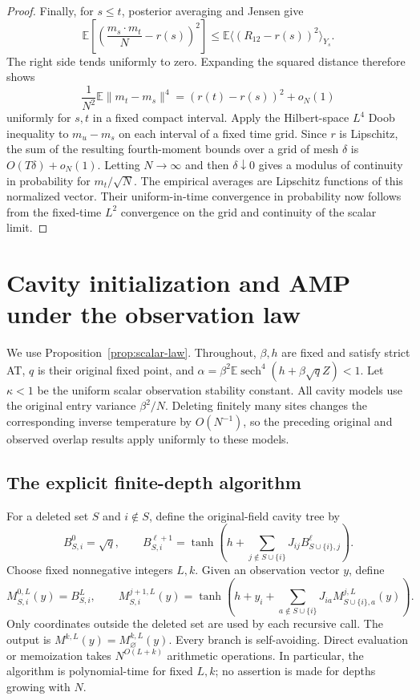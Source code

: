 \documentclass[11pt,reqno]{amsart}
\begin{document}
\begin{proof}
Finally, for $s\le t$, posterior averaging and Jensen give
\[
 \mathbb E\left[\left(\frac{m_s\cdot m_t}{N}-r(s)\right)^2\right]
 \le\mathbb E\langle(R_{12}-r(s))^2\rangle_{Y_s}.
\]
The right side tends uniformly to zero. Expanding the squared distance
therefore shows
\[
 \frac1{N^2}\mathbb E\|m_t-m_s\|^4
 =(r(t)-r(s))^2+o_N(1)
\]
uniformly for $s,t$ in a fixed compact interval.
Apply the Hilbert-space $L^4$ Doob inequality to $m_u-m_s$ on each interval
of a fixed time grid. Since $r$ is Lipschitz, the sum of the resulting
fourth-moment bounds over a grid of mesh $\delta$ is $O(T\delta)+o_N(1)$.
Letting $N\to\infty$ and then $\delta\downarrow0$ gives a modulus of
continuity in probability for $m_t/\sqrt N$.
The empirical averages are Lipschitz functions of this normalized vector.
Their uniform-in-time convergence in probability now follows from the
fixed-time $L^2$ convergence on the grid and continuity of the scalar limit.
\end{proof}


\section{Cavity initialization and AMP under the observation law}\label{sec:initializer-proof}

We use Proposition~\ref{prop:scalar-law}.  Throughout, $\beta,h$ are fixed and satisfy
strict AT, $q$ is their original fixed point, and
$\alpha=\beta^2\mathbb E\operatorname{sech}^4(h+\beta\sqrt q Z)<1$.
Let $\kappa<1$ be the uniform scalar observation stability constant.
All cavity models use the original entry variance $\beta^2/N$.
Deleting finitely many sites changes the corresponding inverse temperature
by $O(N^{-1})$, so the preceding original and observed overlap results
apply uniformly to these models.

\subsection{The explicit finite-depth algorithm}

For a deleted set $S$ and $i\notin S$, define the original-field cavity
tree by
\[
 B^0_{S,i}=\sqrt q,\qquad
 B^{\ell+1}_{S,i}=
 \tanh\left(h+\sum_{j\notin S\cup\{i\}}J_{ij}B^\ell_{S\cup\{i\},j}\right).
\]
Choose fixed nonnegative integers $L,k$.  Given an observation vector $y$,
define
\[
 M^{0,L}_{S,i}(y)=B^L_{S,i},\qquad
 M^{j+1,L}_{S,i}(y)=
 \tanh\left(h+y_i+\sum_{a\notin S\cup\{i\}}
                 J_{ia}M^{j,L}_{S\cup\{i\},a}(y)\right).
\]
Only coordinates outside the deleted set are used by each recursive call.
The output is $M^{k,L}(y)=M^{k,L}_{\varnothing}(y)$.
Every branch is self-avoiding.  Direct evaluation or memoization takes
$N^{O(L+k)}$ arithmetic operations.  In particular, the algorithm is
polynomial-time for fixed $L,k$; no assertion is made for depths growing
with $N$.
\end{document}
